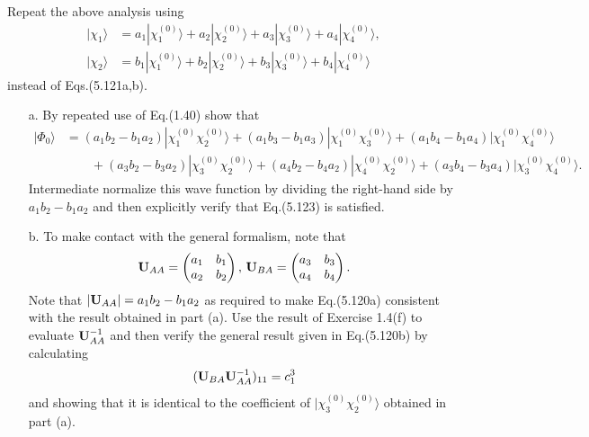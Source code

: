 \documentclass[a4paper]{book}
\newcounter{exercise}[chapter]
\newcommand{\U}{{\bf U}}
\begin{document}
	\begin{exercise}
	Repeat the above analysis using
	\begin{align*}
		| \chi_1 \rangle &= a_1 | \chi^{(0)}_1 \rangle + a_2 | \chi^{(0)}_2 \rangle + a_3 | \chi^{(0)}_3 \rangle + a_4 | \chi^{(0)}_4 \rangle, \\
		| \chi_2 \rangle &= b_1 | \chi^{(0)}_1 \rangle + b_2 | \chi^{(0)}_2 \rangle + b_3 | \chi^{(0)}_3 \rangle + b_4 | \chi^{(0)}_4 \rangle
	\end{align*}
	instead of Eqs.(5.121a,b).
	\begin{enumerate}
	
	\item[a.] By repeated use of Eq.(1.40) show that
	\begin{align*}
		| \Phi_0 \rangle &= ( a_1 b_2 - b_1 a_2 ) | \chi^{(0)}_1 \chi^{(0)}_2 \rangle + ( a_1 b_3 - b_1 a_3 ) | \chi^{(0)}_1 \chi^{(0)}_3 \rangle + ( a_1 b_4 - b_1 a_4 ) | \chi^{(0)}_1 \chi^{(0)}_4 \rangle \\
		&\hspace{2em} + ( a_3 b_2 - b_3 a_2 ) | \chi^{(0)}_3 \chi^{(0)}_2 \rangle + ( a_4 b_2 - b_4 a_2 ) | \chi^{(0)}_4 \chi^{(0)}_2 \rangle + ( a_3 b_4 - b_3 a_4 ) | \chi^{(0)}_3 \chi^{(0)}_4 \rangle .
	\end{align*}
	Intermediate normalize this wave function by dividing the right-hand side by $a_1 b_2 - b_1 a_2$ and then explicitly verify that Eq.(5.123) is satisfied.
	
	\item[b.] To make contact with the general formalism, note that
	\[
		\U_{AA} = \begin{pmatrix} a_1 & b_1 \\ a_2 & b_2 \end{pmatrix}, \, \U_{BA} = \begin{pmatrix} a_3 & b_3 \\ a_4 & b_4 \end{pmatrix}.
	\]
	Note that $|\U_{AA}| = a_1 b_2 - b_1 a_2$ as required to make Eq.(5.120a) consistent with the result obtained in part (a). Use the result of Exercise 1.4(f) to evaluate $\U^{-1}_{AA}$ and then verify the general result given in Eq.(5.120b) by calculating
	\[
		(\U_{BA}\U^{-1}_{AA})_{11} = c^3_1	
	\]
	and showing that it is identical to the coefficient of $| \chi^{(0)}_3 \chi^{(0)}_2 \rangle$ obtained in part (a).
	\end{enumerate}
	\end{exercise}
	
\end{document}
